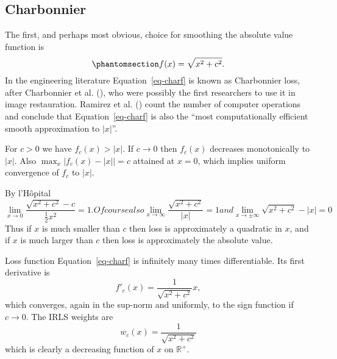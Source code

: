 \documentclass[
  12pt,
  letterpaper,
  DIV=11,
  numbers=noendperiod]{scrartcl}
\theoremstyle{definition}
\theoremstyle{definition}
\theoremstyle{plain}
\theoremstyle{plain}
\theoremstyle{plain}
\theoremstyle{remark}
\begin{document}
\subsection{Charbonnier}\label{sec-charb}

The first, and perhaps most obvious, choice for smoothing the absolute
value function is \begin{equation}\phantomsection\label{eq-charf}{
f(x)=\sqrt{x^2 + c^2}.
}\end{equation} In the engineering literature Equation~\ref{eq-charf} is
known as Charbonnier loss, after Charbonnier et al.
(), who
were possibly the first researchers to use it in image restauration.
Ramirez et al.
() count the
number of computer operations and conclude that Equation~\ref{eq-charf}
is also the ``most computationally efficient smooth approximation to
\(|x|\)''.

For \(c>0\) we have \(f_c(x)>|x|\). If \(c\rightarrow 0\) then
\(f_c(x)\) decreases monotonically to \(|x|\). Also
\(\max_x|f_c(x)-|x||=c\) attained at \(x=0\), which implies uniform
convergence of \(f_c\) to \(|x|\).

By l'Hôpital \begin{subequations}
\begin{equation}
\lim_{x\rightarrow 0}\frac{\sqrt{x^2+c^2}-c}{\frac12x^2}=1.
\end{equation}
Of course also
\begin{equation}
\lim_{x\rightarrow\infty}\frac{\sqrt{x^2+c^2}}{|x|}=1
\end{equation}
and
\begin{equation}
\lim_{x\rightarrow\pm\infty}\sqrt{x^2+c^2}-|x|=0
\end{equation}
\end{subequations} Thus if \(x\) is much smaller than \(c\) then loss is
approximately a quadratic in \(x\), and if \(x\) is much larger than
\(c\) then loss is approximately the absolute value.

Loss function Equation~\ref{eq-charf} is infinitely many times
differentiable. Its first derivative is \begin{equation}
f'_c(x)=\frac{1}{\sqrt{x^2+c^2}}x,\label{eq:charg}
\end{equation} which converges, again in the sup-norm and uniformly, to
the sign function if \(c\rightarrow 0\). The IRLS weights are
\begin{equation}
w_c(x)=\frac{1}{\sqrt{x^2+c^2}}\label{eq:charw}
\end{equation} which is clearly a decreasing function of \(x\) on
\(\mathbb{R}^+\).
\end{document}
